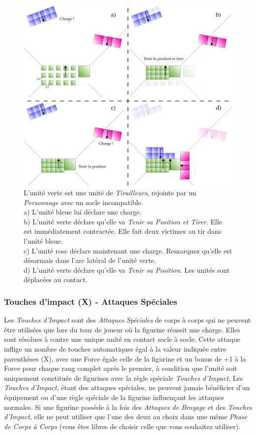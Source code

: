 \begin{figure}[!htbp]
\centering
\includegraphics[width=15.5cm]{tirailleurs.png}
\caption{L'unité verte est une unité de \emph{Tirailleurs}, rejointe par un \emph{Personnage} avec un socle incompatible. \\
a) L'unité bleue lui déclare une charge. \\
b) L'unité verte déclare qu'elle va \emph{Tenir sa Position et Tirer}. Elle est immédiatement contractée. Elle fait deux victimes au tir dans l'unité bleue. \\
c) L'unité rose déclare maintenant une charge. Remarquez qu'elle est désormais dans l'arc latéral de l'unité verte. \\
d) L'unité verte déclare qu'elle va \emph{Tenir sa Position}. Les unités sont déplacées au contact.}
\label{figure/tirailleurs}
\end{figure}

\subsubsection*{Touches d'impact (X) - Attaques Spéciales}

Les \emph{Touches d'Impact} sont des \emph{Attaques Spéciales} de corps à corps qui ne peuvent être utilisées que lors du tour de joueur où la figurine réussit une charge. Elles sont résolues à  contre une unique unité en contact socle à socle. Cette attaque inflige un nombre de touches automatiques égal à la valeur indiquée entre parenthèses (X), avec une Force égale celle de la figurine et un bonus de +1 à la Force pour chaque rang complet après le premier, à condition que l'unité soit uniquement constituée de figurines avec la règle spéciale \emph{Touches d'Impact}. Les \emph{Touches d'Impact}, étant des attaques spéciales, ne peuvent jamais bénéficier d'un équipement ou d'une règle spéciale de la figurine influençant les attaques normales.  Si une figurine possède à la fois des \emph{Attaques de Broyage} et des \emph{Touches d'Impact}, elle ne peut utiliser que l'une des deux au choix dans une même \emph{Phase de Corps à Corps} (vous êtes libres de choisir celle que vous souhaitez utiliser).

